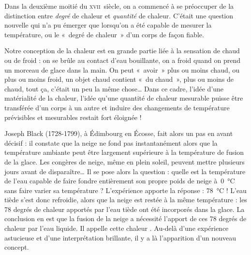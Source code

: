 \atstartofhistorysection
{}
\label{ch_histoire_quantite_chaleur_depondt}


	Dans la deuxième moitié du \textsc{xvii}\ieme\ siècle, on a commencé à se préoccuper de la distinction entre \emph{degré} de chaleur et \emph{quantité} de chaleur. C'était une question nouvelle qui n'a pu émerger que lorsqu'on a été capable de mesurer la température, ou le «~degré de chaleur~» d'un corps de façon fiable.

	Notre conception de la chaleur est en grande partie liée à la sensation de chaud ou de froid : on se brûle au contact d'eau bouillante, on a froid quand on prend un morceau de glace dans la main. On peut «~avoir~» plus ou moins chaud, ou plus ou moins froid, un objet chaud contient «~du chaud~», plus ou moins de chaud, tout ça, c'était un peu la même chose… Dans ce cadre, l'idée d'une matérialité de la chaleur, l'idée qu'une quantité de chaleur mesurable puisse être transférée d'un corps à un autre et induire des changements de température prévisibles et mesurables restait fort éloignée !

	Joseph Black (1728-1799), à Édimbourg en Écosse, fait alors un pas en avant décisif : il constate que la neige ne fond pas instantanément alors que la température ambiante peut être largement supérieure à la température de fusion de la glace. Les congères de neige, même en plein soleil, peuvent mettre plusieurs jours avant de disparaître… Il se pose alors la question : quelle est la température de l’eau capable de faire fondre entièrement son propre poids de neige à~\SI{0}{\degreeCelsius} sans faire varier sa température ? L’expérience apporte la réponse : \SI{78}{\degreeCelsius} ! L'eau tiède s'est donc refroidie, alors que la neige est restée à la même température : les 78 degrés de chaleur apportés par l'eau tiède ont été incorporés dans la glace. La conclusion en est que la fusion de la neige a nécessité l'apport de ces 78 degrés de chaleur par l'eau liquide. Il appelle cette chaleur . Au-delà d'une expérience astucieuse et d'une interprétation brillante, il y a là l'apparition d'un nouveau concept.

